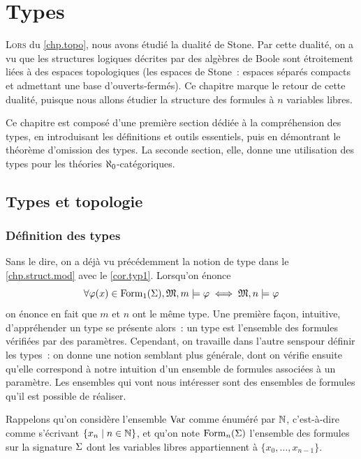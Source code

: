 \chapter{Types}
\label{chp.types.mod}

\minitoc

\lettrine{L}{ors} du \cref{chp.topo}, nous avons étudié la dualité de Stone.
Par cette dualité, on a vu que les structures logiques décrites par des algèbres
de Boole sont étroitement liées à des espaces topologiques (les espaces de
Stone~: espaces séparés compacts et admettant une base d'ouverts-fermés). Ce
chapitre marque le retour de cette dualité, puisque nous allons étudier la
structure des formules à $n$ variables libres.

Ce chapitre est composé d'une première section dédiée à la compréhension des
types, en introduisant les définitions et outils essentiels, puis en démontrant
le théorème d'omission des types. La seconde section, elle, donne une
utilisation des types pour les théories $\aleph_0$-catégoriques.

\section{Types et topologie}

\subsection{Définition des types}

Sans le dire, on a déjà vu précédemment la notion de type dans le
\cref{chp.struct.mod} avec le \cref{cor.typ1}. Lorsqu'on énonce
\[\forall \varphi(x)\in\operatorname{Form}_1(\Sigma), \mathfrak{M},m\models\varphi \iff
\mathfrak{M},n\models\varphi\]
on énonce en fait que $m$ et $n$ ont le même type. Une première façon,
intuitive, d'appréhender un type se présente alors~: un type est l'ensemble des
formules vérifiées par des paramètres.
Cependant, on travaille \og dans l'autre sens\fg pour définir les types~: on
donne une notion semblant plus générale, dont on vérifie ensuite qu'elle
correspond à notre intuition d'un ensemble de formules associées à un paramètre.
Les ensembles qui vont nous intéresser sont des ensembles de formules qu'il est
possible de réaliser.

Rappelons qu'on considère l'ensemble $\operatorname{Var}$ comme énuméré par $\mathbb N$,
c'est-à-dire comme s'écrivant $\left\{ x_n \;\middle\vert\; n \in \mathbb N \right\}$, et qu'on note
$\operatorname{Form}_n(\Sigma)$ l'ensemble des formules sur la signature $\Sigma$ dont les
variables libres appartiennent à $\{x_0,\ldots,x_{n-1}\}$.

